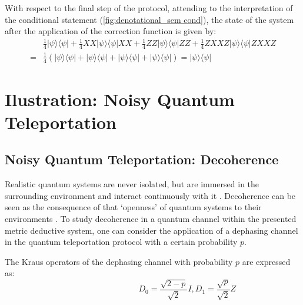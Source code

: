With respect to the final step of the protocol, attending to the interpretation of the conditional statement (\autoref{fig:denotational_sem cond}), the state of the system after the application of the correction function is given by:
\begin{equation} \label{eq:teleport_correction}
  \begin{split}
  &\frac{1}{4}|\psi\rangle \langle \psi| + \frac{1}{4} X X|\psi\rangle \langle \psi|XX +\frac{1}{4} ZZ|\psi\rangle \langle \psi|ZZ + \frac{1}{4} ZXXZ|\psi\rangle \langle \psi|ZXXZ  \\
  =& \frac{1}{4} \left( |\psi\rangle \langle \psi| + |\psi\rangle \langle \psi| + |\psi\rangle \langle \psi|+ |\psi\rangle \langle \psi| \right) =  |\psi\rangle \langle \psi|
  \end{split}
\end{equation}

\section{Ilustration: Noisy Quantum Teleportation} \label{subsec:noisy_teleportation}


\subsection{Noisy Quantum Teleportation: Decoherence}


Realistic quantum systems are never isolated, but are immersed
in the surrounding environment and interact continuously with it \cite{schlosshauer2005decoherence}. Decoherence can be seen as the consequence of that  `openness' of quantum systems to their  environments .  To study decoherence in a quantum channel within the presented metric deductive system, one can consider the application of a dephasing channel in the quantum teleportation protocol with a certain probability $p$.

The Kraus operators of the dephasing channel with probability $p$ are expressed as:
\begin{equation}
    \hspace{100pt} D_{0}= \frac{\sqrt{2-p}}{\sqrt{2}} I,  D_{1}= \frac{\sqrt{p}}{\sqrt{2}} Z
\end{equation}

